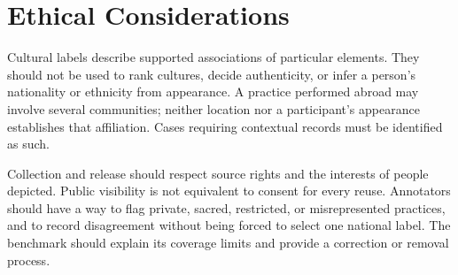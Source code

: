\section*{Ethical Considerations}
\label{sec:ethics}

Cultural labels describe supported associations of particular elements.
They should not be used to rank cultures, decide authenticity, or infer a
person's nationality or ethnicity from appearance. A practice performed
abroad may involve several communities; neither location nor a participant's
appearance establishes that affiliation. Cases requiring contextual records
must be identified as such.

Collection and release should respect source rights and the interests of
people depicted. Public visibility is not equivalent to consent for every
reuse. Annotators should have a way to flag private, sacred, restricted, or
misrepresented practices, and to record disagreement without being forced
to select one national label. The benchmark should explain its coverage
limits and provide a correction or removal process.
